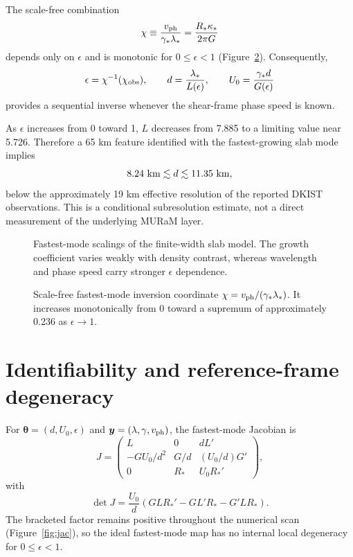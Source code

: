 \documentclass[linenumbers]{aastex7}
\begin{document}
The scale-free combination
\begin{equation}
\chi\equiv\frac{v_{\rm ph}}{\gamma_\ast\lambda_\ast}
=\frac{R_\ast\kappa_\ast}{2\pi G}
\end{equation}
depends only on $\epsilon$ and is monotonic for $0\leq\epsilon<1$ (Figure~\ref{fig:chi}). Consequently,
\begin{equation}
\epsilon=\chi^{-1}(\chi_{\rm obs}),\qquad
d=\frac{\lambda_\ast}{L(\epsilon)},\qquad
U_0=\frac{\gamma_\ast d}{G(\epsilon)}
\end{equation}
provides a sequential inverse whenever the shear-frame phase speed is known.

As $\epsilon$ increases from 0 toward 1, $L$ decreases from 7.885 to a limiting value near 5.726. Therefore a 65 km feature identified with the fastest-growing slab mode implies
\begin{equation}
8.24~{\rm km}\lesssim d\lesssim11.35~{\rm km},
\end{equation}
below the approximately 19 km effective resolution of the reported DKIST observations. This is a conditional subresolution estimate, not a direct measurement of the underlying MURaM layer.

\begin{figure}
\caption{Fastest-mode scalings of the finite-width slab model. The growth coefficient varies weakly with density contrast, whereas wavelength and phase speed carry stronger $\epsilon$ dependence.}
\label{fig:scalings}
\end{figure}

\begin{figure}
\caption{Scale-free fastest-mode inversion coordinate $\chi=v_{\rm ph}/(\gamma_\ast\lambda_\ast)$. It increases monotonically from 0 toward a supremum of approximately 0.236 as $\epsilon\rightarrow1$.}
\label{fig:chi}
\end{figure}

\section{Identifiability and reference-frame degeneracy}
For $\boldsymbol{\theta}=(d,U_0,\epsilon)$ and $\boldsymbol{y}=(\lambda,\gamma,v_{\rm ph})$, the fastest-mode Jacobian is
\begin{equation}
J=
\begin{pmatrix}
L&0&dL'\\
-GU_0/d^2&G/d&(U_0/d)G'\\
0&R_\ast&U_0R_\ast'
\end{pmatrix},
\end{equation}
with
\begin{equation}
\det J=\frac{U_0}{d}
\left(GLR_\ast'-GL'R_\ast-G'LR_\ast\right).
\end{equation}
The bracketed factor remains positive throughout the numerical scan (Figure~\ref{fig:jac}), so the ideal fastest-mode map has no internal local degeneracy for $0\leq\epsilon<1$.
\end{document}
